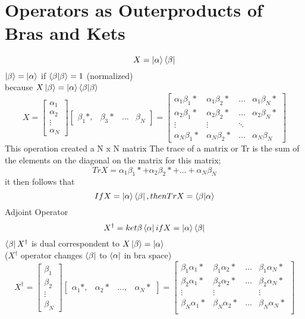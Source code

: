 \documentclass{book}
\begin{document}
\section{Operators as Outerproducts of Bras and Kets}
$$X=\ket{\alpha} \bra{\beta}$$
$\ket{\beta} = \ket{\alpha}$ if $\braket{\beta}{\beta} = 1$ (normalized) \\
because $X\ket{\beta} = \ket{\alpha}\bra{\beta}\ket{\beta}$
$$X = \begin{bmatrix}
	\alpha_1 \\ \alpha_2 \\ \vdots \\ \alpha_N
\end{bmatrix}
\begin{bmatrix}
	\beta_1*, & \beta_3* &  \hdots & \beta_N
\end{bmatrix}
=
\begin{bmatrix}
	\alpha_1\beta_1* & \alpha_1\beta_2* & \hdots & \alpha_1\beta_N* \\
	\alpha_2\beta_1* & \alpha_2\beta_2* & \hdots & \alpha_2\beta_N* \\
	\vdots & \vdots &  \ddots \\
	\alpha_N\beta_1* & \alpha_N\beta_2* & \hdots & \alpha_N\beta_N
\end{bmatrix}
$$
This operation created a N x N matrix
The trace of a matrix or Tr is the sum of the elements on the diagonal on the matrix for this matrix;
$$Tr X = \alpha_1\beta_1* + \alpha_2\beta_2* + \hdots + \alpha_N \beta_N $$
it then follows that
$$If X =\ket{\alpha}\bra{\beta}, then Tr X = \braket{\beta}{\alpha}$$
Adjoint Operator
$$X^\dagger = ket{\beta}\bra{\alpha} if X = \ket{\alpha}\bra{\beta}$$
$\bra{\beta} X^\dagger$ is dual correspondent to $X\ket{\beta} = \ket{\alpha}$ \\
($X^\dagger$ operator changes $\bra{\beta}$ to $\bra{\alpha}$ in bra space) \\
$$X^\dagger = 
\begin{bmatrix}
   \beta_1 \\ \beta_2 \\ \vdots \\ \beta_N
\end{bmatrix}
\begin{bmatrix}
   \alpha_1*, & \alpha_2* & \hdots, & \alpha_N*
\end{bmatrix}
=
\begin{bmatrix}
  \beta_1\alpha_1* & \beta_1\alpha_2* & \hdots & \beta_1\alpha_N* \\
   \beta_2\alpha_1* & \beta_2\alpha_2* & \hdots & \beta_2\alpha_N* \\
   \vdots & \vdots & & \vdots \\
   \beta_N\alpha_1* & \beta_N\alpha_2* & \hdots & \beta_N\alpha_N* \\
\end{bmatrix}
$$
\end{document}
